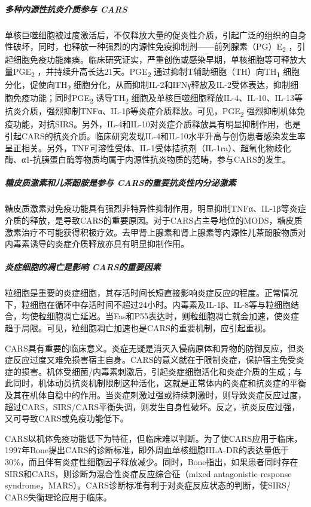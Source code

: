\subparagraph{多种内源性抗炎介质参与 CARS}

单核巨噬细胞被过度激活后，不仅释放大量的促炎性介质，引起广泛的组织的自身性破坏，同时，也释放一种强烈的内源性免疫抑制剂------前列腺素（PG）E\textsubscript{2}
，引起细胞免疫功能瘫痪。临床研究证实，严重创伤或感染早期，单核细胞等可释放大量PGE\textsubscript{2}
，并持续升高长达21天。PGE\textsubscript{2}
通过抑制T辅助细胞（TH）向TH\textsubscript{1}
细胞分化，促使向TH\textsubscript{2}
细胞分化，从而抑制IL-2和IFNγ释放及IL-2受体表达，抑制细胞免疫功能；同时PGE\textsubscript{2}
诱导TH\textsubscript{2}
细胞及单核巨噬细胞释放IL-4、IL-10、IL-13等抗炎介质，强烈抑制TNFα、IL-1β等炎症介质释放。可见，PGE\textsubscript{2}
强烈抑制机体免疫功能，对抗SIRS。另外，IL-4和IL-10对炎症介质释放具有明显抑制作用，也是引起CARS的抗炎介质。临床研究发现IL-4和IL-10水平升高与创伤患者感染发生率呈正相关。另外，TNF可溶性受体、IL-1受体拮抗剂（IL-1ra）、超氧化物歧化酶、α1-抗胰蛋白酶等物质均属于内源性抗炎物质的范畴，参与CARS的发生。

\subparagraph{糖皮质激素和儿茶酚胺是参与 CARS的重要抗炎性内分泌激素}

糖皮质激素对免疫功能具有强烈非特异性抑制作用，明显抑制TNFα、IL-1β等炎症介质的释放，是导致CARS的重要原因。对于CARS占主导地位的MODS，糖皮质激素治疗不可能获得积极疗效。去甲肾上腺素和肾上腺素等内源性儿茶酚胺物质对内毒素诱导的炎症介质释放亦具有明显抑制作用。

\subparagraph{炎症细胞的凋亡是影响 CARS的重要因素}

粒细胞是重要的炎症细胞，其存活时间长短直接影响炎症反应的程度。正常情况下，粒细胞在循环中存活时间不超过24小时。内毒素及IL-1β、IL-8等与粒细胞结合，均使粒细胞凋亡延迟。当Fas和P55表达时，则粒细胞凋亡就会加速，使炎症趋于局限。可见，粒细胞凋亡加速也是CARS的重要机制，应引起重视。

CARS具有重要的临床意义。炎症无疑是消灭入侵病原体和异物的防御反应，但炎症反应过度又难免损害宿主自身。CARS的意义就在于限制炎症，保护宿主免受炎症的损害。机体受细菌/内毒素刺激后，引起炎症细胞活化和炎症介质的生成；与此同时，机体动员抗炎机制限制这种活化，这就是正常体内的炎症和抗炎症的平衡及其在机体自稳中的作用。当炎症刺激过强或持续刺激时，则导致炎症反应过度，超过CARS，SIRS/CARS平衡失调，则发生自身性破坏。反之，抗炎反应过强，又可导致CARS或免疫功能低下。

CARS以机体免疫功能低下为特征，但临床难以判断。为了使CARS应用于临床，1997年Bone提出CARS的诊断标准，即外周血单核细胞HLA-DR的表达量低于30\%，而且伴有炎症性细胞因子释放减少。同时，Bone指出，如果患者同时存在SIRS和CARS，则诊断为混合性炎症反应综合征（mixed
antagonistic response
syndrome，MARS）。CARS诊断标准有利于对炎症反应状态的判断，使SIRS/
CARS失衡理论应用于临床。

